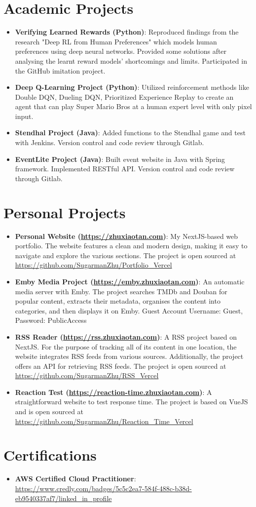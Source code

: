 \documentclass[letterpaper,10pt]{article}
\newcommand{\resumeItem}[2]{
  \item\small{
    \textbf{#1}{: #2 \vspace{-2pt}}
  }
}
\newcommand{\resumeSubItem}[2]{\resumeItem{#1}{#2}\vspace{-4pt}}
\newcommand{\resumeSubHeadingListStart}{\begin{itemize}[leftmargin=*]}
\newcommand{\resumeSubHeadingListEnd}{\end{itemize}}
\begin{document}
\section{Academic Projects}
\resumeSubHeadingListStart
\resumeSubItem{Verifying Learned Rewards (Python)}{Reproduced findings from the research "Deep RL from Human Preferences" which models human preferences using deep neural networks. Provided some solutions after analysing the learnt reward models' shortcomings and limits. Participated in the GitHub imitation project.}
\resumeSubItem{Deep Q-Learning Project (Python)}{Utilized reinforcement methods like Double DQN, Dueling DQN, Prioritized Experience Replay to create an agent that can play Super Mario Bros at a human expert level with only pixel input.}
\resumeSubItem{Stendhal Project (Java)}{Added functions to the Stendhal game and test with Jenkins. Version control and code review through Gitlab.}
\resumeSubItem{EventLite Project (Java)}{Built event website in Java with Spring framework. Implemented RESTful API. Version control and code review through Gitlab.}
\resumeSubHeadingListEnd

\section{Personal Projects}
\resumeSubHeadingListStart
\resumeSubItem{Personal Website (\url{https://zhuxiaotan.com})}{My NextJS-based web portfolio. The website features a clean and modern design, making it easy to navigate and explore the various sections. The project is open sourced at \url{https://github.com/SugarmanZhu/Portfolio_Vercel}}
\resumeSubItem{Emby Media Project (\url{https://emby.zhuxiaotan.com})}{An automatic media server with Emby. The project searches TMDb and Douban for popular content, extracts their metadata, organises the content into categories, and then displays it on Emby. Guest Account Username: Guest, Password: PublicAccess}
\resumeSubItem{RSS Reader (\url{https://rss.zhuxiaotan.com})}{A RSS project based on NextJS. For the purpose of tracking all of its content in one location, the website integrates RSS feeds from various sources. Additionally, the project offers an API for retrieving RSS feeds. The project is open sourced at \url{https://github.com/SugarmanZhu/RSS_Vercel}}
\resumeSubItem{Reaction Test (\url{https://reaction-time.zhuxiaotan.com})}{A straightforward website to test response time. The project is based on VueJS and is open sourced at \url{https://github.com/SugarmanZhu/Reaction_Time_Vercel}}
\resumeSubHeadingListEnd

\section{Certifications}
\resumeSubHeadingListStart
\resumeSubItem{AWS Certified Cloud Practitioner}{\url{https://www.credly.com/badges/5c5c2ea7-584f-488c-b38d-eb9540337af7/linked_in_profile}}
\resumeSubHeadingListEnd
\end{document}
